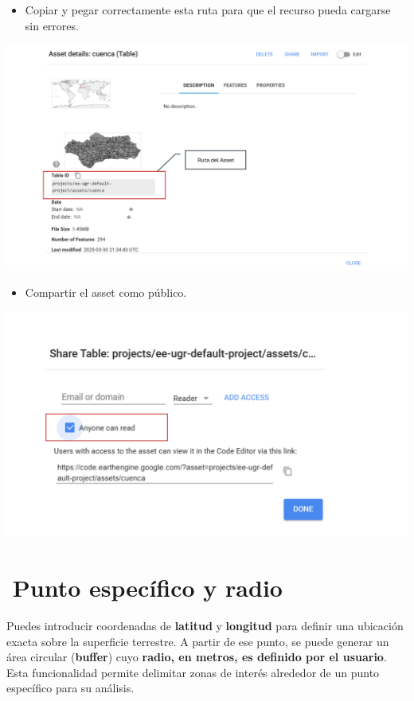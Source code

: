 \documentclass[
]{book}
\providecommand{\tightlist}{%
  \setlength{\itemsep}{0pt}\setlength{\parskip}{0pt}}
\begin{document}
\begin{itemize}
\tightlist
\item
  Copiar y pegar correctamente esta ruta para que el recurso pueda cargarse sin errores.
\end{itemize}

\includegraphics{assets/asset1_es.png}

\begin{itemize}
\tightlist
\item
  Compartir el asset como público.
\end{itemize}

\includegraphics{assets/asset_2.png}

\section{\texorpdfstring{\textbf{📌Punto específico y radio}}{📌Punto específico y radio}}\label{punto-especuxedfico-y-radio}

Puedes introducir coordenadas de \textbf{latitud} y \textbf{longitud} para definir una ubicación exacta sobre la superficie terrestre. A partir de ese punto, se puede generar un área circular (\textbf{buffer}) cuyo \textbf{radio, en metros, es definido por el usuario}. Esta funcionalidad permite delimitar zonas de interés alrededor de un punto específico para su análisis.
\end{document}
